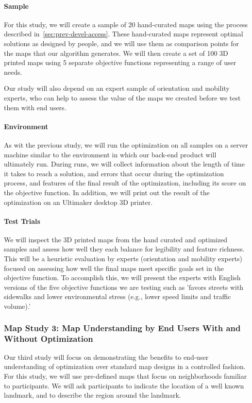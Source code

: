 \paragraph{Sample} 
For this study, we will create a sample of 20 hand-curated maps using the process described in~\ref{sec:prev-devel-access}. These hand-curated maps represent optimal solutions as designed by people, and we will use them as comparison points for the maps that our algorithm generates.  We will then create a set of 100 3D printed maps using 5 separate objective functions representing a range of user needs.

Our study will also depend on an expert sample of orientation and mobility experts, who can help to assess the value of the maps we created before we test them with end users. 

\paragraph{Environment}
As wit the previous study, we will run the optimization on all samples on a server machine similar to the environment in which our back-end product will ultimately run. During runs, we will collect information about the length of time it takes to reach a solution, and errors that occur during the optimization process, and features of the final result of the optimization, including its score on the objective function. In addition, we will print out the result of the optimization on an Ultimaker desktop 3D printer.

\paragraph{Test Trials}
We will inspect the 3D printed maps from the hand curated and optimized samples and assess how well they each balance for legibility and feature richness. This will be a heuristic evaluation by experts (orientation and mobility experts) focused on assessing how well the final maps meet specific goals set in the objective function. To accomplish this, we will present the experts with English versions of the five objective functions we are testing such as 'favors streets with sidewalks and lower environmental stress (e.g., lower speed limits and traffic volume).' 

\subsubsection{Map Study 3: Map Understanding by End Users With and Without Optimization}
\label{sec:lab-tests}
Our third study will focus on demonstrating the benefits to end-user understanding of optimization over standard map designs in a controlled fashion. For this study, we will use pre-defined maps that focus on neighborhoods familiar to participants. We will ask participants to indicate the location of a well known landmark, and to describe the region around the landmark. 

